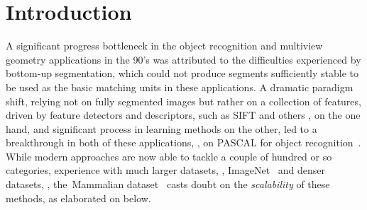\section{Introduction}
 A significant progress bottleneck in the object recognition and multiview geometry applications in
the 90's was attributed to the difficulties experienced by bottom-up segmentation,
which could not produce segments sufficiently stable to be used as the
basic  matching units in these applications. A dramatic  paradigm shift,
relying not on fully segmented images but rather on a collection of features, driven by feature detectors \cite{Mikolajczyk:Tuytelaars:Schmid:Zisserman:Matas:Schaffalitzky:Kadir:VanGool:IJCV05} and descriptors, such as SIFT \cite{lowe:distinctive:IJCV04} and others \cite{Mikolajczyk:Schmid:PAMI05}, on the one hand, and significant process
in  learning methods on the other, led to a breakthrough in both of these
applications, \eg, on PASCAL for  object recognition~\cite{Felzenszwalb:etal:PAMI10}.  While modern approaches are now able to tackle a couple of hundred or so categories, experience
with  much larger datasets, \eg,  ImageNet~\cite{Deng:etal:CVPR09}
and denser datasets, \eg, the~Mammalian dataset~\cite{Fink:Ullman:IJCV08} 
casts doubt on the \textit{scalability} of these methods, as elaborated on below.

